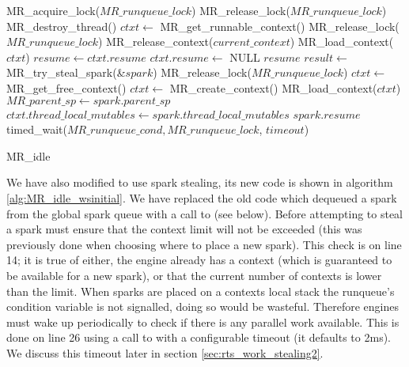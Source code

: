 \begin{algorithm}
\begin{algorithmic}[1]
  \State MR\_acquire\_lock($MR\_runqueue\_lock$)
  \Loop
      \State MR\_release\_lock($MR\_runqueue\_lock$)
      \State MR\_destroy\_thread()
    \EndIf
    \State $ctxt \gets$ MR\_get\_runnable\_context()
      \State MR\_release\_lock($MR\_runqueue\_lock$)
        \State MR\_release\_context($current\_context$)
      \EndIf
      \State MR\_load\_context($ctxt$)
      \State $resume \gets ctxt.resume$
      \State $ctxt.resume \gets$ NULL
      \Goto $resume$
    \EndIf
      \State $result \gets$ MR\_try\_steal\_spark(\&$spark$)
        \State MR\_release\_lock($MR\_runqueue\_lock$)
          \State $ctxt \gets$ MR\_get\_free\_context()
            \State $ctxt \gets$ MR\_create\_context()
          \EndIf
          \State MR\_load\_context($ctxt$)
        \EndIf
        \State $MR\_parent\_sp \gets spark.parent\_sp$
        \State $ctxt.thread\_local\_mutables \gets
          spark.thread\_local\_mutables$
        \Goto $spark.resume$
      \EndIf
    \EndIf
    \State timed\_wait($MR\_runqueue\_cond, MR\_runqueue\_lock$, $timeout$)
  \EndLoop
\EndProcedure
\end{algorithmic}
\caption{MR\_idle}
\label{alg:MR_idle_wsinitial}
\end{algorithm}

We have also modified \idle to use spark stealing,
its new code is shown in algorithm \ref{alg:MR_idle_wsinitial}.
We have replaced the old code which dequeued a spark from the global spark
queue
with a call to \trystealspark (see below).
Before attempting to steal a spark \idle must ensure that the context limit
will not be exceeded
(this was previously done when choosing where to place a new spark).
This check is on line 14; it is true of either,
the engine already has a context (which is guaranteed to be available for a
new spark), 
or that the current number of contexts is lower than the limit.
When sparks are placed on a contexts local stack the runqueue's condition
variable is not signalled,
doing so would be wasteful.
Therefore engines must wake up periodically to check if there is any
parallel work available.
This is done on line 26 using a call to  with a
configurable timeout (it defaults to 2ms).
We discuss this timeout later in section \ref{sec:rts_work_stealing2}.


